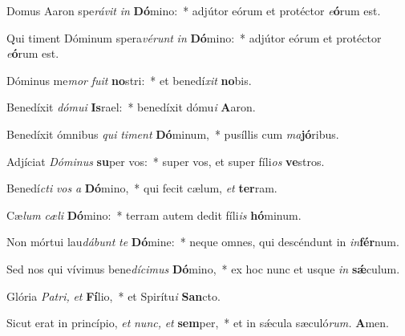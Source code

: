 \item Domus Aaron spe\tinyhspace\textit{rávit} \textit{in} \textbf{Dó}mino:~* adjútor eórum et protéctor \textit{e}\textbf{ó}rum est.
\item Qui timent Dóminum spera\tinyhspace\textit{vérunt} \textit{in} \textbf{Dó}mino:~* adjútor eórum et protéctor \textit{e}\textbf{ó}rum est.
\item Dóminus me\tinyhspace\textit{mor} \textit{fuit} \textbf{no}stri:~* et benedí\tinyhspace\textit{xit} \textbf{no}bis.
\item Benedíxit \textit{dómui} \textbf{Is}rael:~* benedíxit dómu\textit{i} \textbf{A}aron.
\item Benedíxit ómnibus \textit{qui} \textit{timent} \textbf{Dó}minum,~* pusíllis cum \textit{ma}\textbf{jó}ribus.
\item Adjíciat \textit{Dóminus} \textbf{su}per vos:~* super vos, et super fíli\textit{os} \textbf{ve}stros.
\item Benedí\tinyhspace\textit{cti} \textit{vos} \textit{a} \textbf{Dó}mino,~* qui fecit cælum, \textit{et} \textbf{ter}ram.
\item Cæ\tinyhspace\textit{lum} \textit{cæli} \textbf{Dó}mino:~* terram autem dedit fíli\textit{is} \textbf{hó}minum.
\item Non mórtui lau\tinyhspace\textit{dábunt} \textit{te} \textbf{Dó}mine:~* neque o\-mnes, qui descéndunt in \textit{in}\textbf{fér}num.
\item Sed nos qui vívimus bene\tinyhspace\tinyhspace\textit{dícimus} \textbf{Dó}mino,~* ex hoc nunc et usque \textit{in} \textbf{sǽ}culum.
\item Glória \textit{Patri,} \textit{et} \textbf{Fí}lio,~* et Spirítu\tinyhspace\textit{i} \textbf{San}cto.
\item Sicut erat in princípio, \textit{et} \textit{nunc,} \textit{et} \textbf{sem}per,~* et in sǽcula sæculó\textit{rum.} \textbf{A}men.
